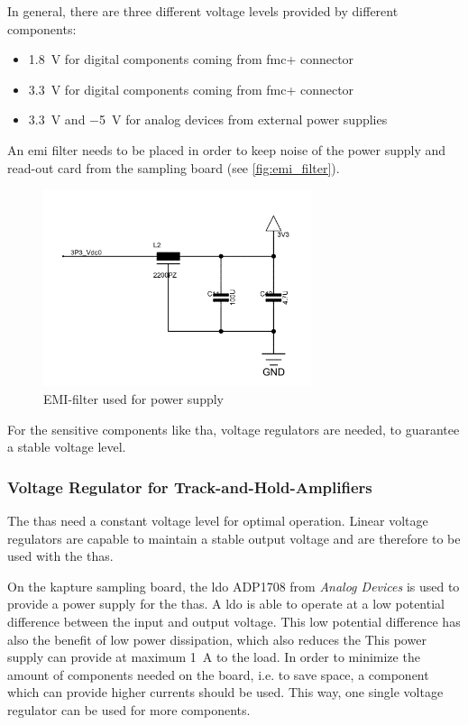 In general, there are three different voltage levels provided by different components:
\begin{itemize}
	\item \SI{1.8}{\volt} for digital components coming from \gls{fmc}+ connector
	\item \SI{3.3}{\volt} for digital components coming from \gls{fmc}+ connector
	\item \SI{3.3}{\volt} and \SI{-5}{\volt} for analog devices from external power supplies 
\end{itemize}
An \gls{emi} filter needs to be placed in order to keep noise of the power supply and read-out card from the sampling board (see \autoref{fig:emi_filter}).
\begin{figure}[tbh]
	\centering
	\includegraphics[width = 0.7\textwidth]{chap/04-work/img/emi_filter}
	\caption{EMI-filter used for power supply}
	\label{fig:emi_filter}
\end{figure}

For the sensitive components like \gls{tha}, voltage regulators are needed, to guarantee a stable voltage level.


\subsubsection*{Voltage Regulator for Track-and-Hold-Amplifiers}
The \glspl{tha} need a constant voltage level for optimal operation. 
Linear voltage regulators are capable to maintain a stable output voltage and are therefore to be used with the \glspl{tha}.

On the \gls{kapture} sampling board, the \gls{ldo} ADP1708 from \textit{Analog Devices} is used to provide a power supply for the \glspl{tha}. 
A \gls{ldo} is able to operate at a low potential difference between the input and output voltage. This low potential difference has also the benefit of low power dissipation, which also reduces the    
This power supply can provide at maximum \SI{1}{\ampere} to the load. 
In order to minimize the amount of components needed on the board, i.e. to save space, a component which can provide higher currents should be used. 
This way, one single voltage regulator can be used for more components.

